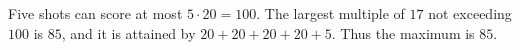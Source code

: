 Five shots can score at most $5\cdot20=100$. The largest multiple of $17$ not exceeding $100$ is $85$, and it is attained by $20+20+20+20+5$. Thus the maximum is $\boxed{85}$.
